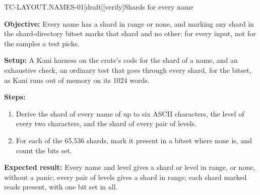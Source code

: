 \begin{requirement}{TC-LAYOUT.NAMES-01}[draft][verify]{Shards for every name}


  \textbf{Objective:} Every name has a shard in range or none, and marking
  any shard in the shard-directory bitset marks that shard and no other:
  for every input, not for the samples a test picks.

  \textbf{Setup:} A Kani harness on the crate's code for the shard of a
  name, and an exhaustive check, an ordinary test that goes through every
  shard, for the bitset, as Kani runs out of memory on its 1024 words.

  \textbf{Steps:}
  \begin{enumerate}
    \item Derive the shard of every name of up to six ASCII characters, the
      level of every two characters, and the shard of every pair of levels.
    \item For each of the 65,536 shards, mark it present in a bitset where
      none is, and count the bits set.
  \end{enumerate}

  \textbf{Expected result:} Every name and level gives a shard or level in
  range, or none, without a panic; every pair of levels gives a shard in
  range; each shard marked reads present, with one bit set in all.



\end{requirement}

